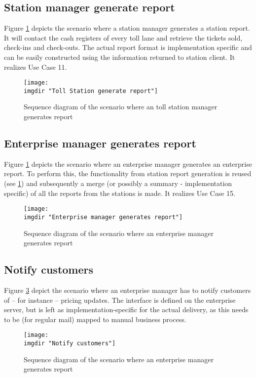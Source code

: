 \subsection{Station manager generate report}
Figure \ref{fig:seq_diag:station_manager_generate_report} depicts the scenario where a station manager generates a station report. It will contact the cash registers of every toll lane and retrieve the tickets sold, check-ins and check-outs. The actual report format is implementation specific and can be easily constructed using the information returned to station client. It realizes Use Case 11.
\begin{figure} %
  \texttt{[image: \\imgdir "Toll Station generate report"]}
  \caption{Sequence diagram of the scenario where an toll station manager generates report}
  \label{fig:seq_diag:station_manager_generate_report}
\end{figure}

\subsection{Enterprise manager generates report}
Figure \ref{fig:seq_diag:station_manager_generate_report} depicts the scenario where an enterprise manager generates an enterprise report. To perform this, the functionality from station report generation is reused (see \ref{fig:seq_diag:station_manager_generate_report}) and subsequently a merge (or possibly a summary - implementation specific) of all the reports from the stations is made. It realizes Use Case 15.
\begin{figure}%
  \texttt{[image: \\imgdir "Enterprise manager generates report"]}
  \caption{Sequence diagram of the scenario where an enterprise manager generates report}
  \label{fig:seq_diag:enterprise_manager_generate_report}
\end{figure}

\subsection{Notify customers}
Figure \ref{fig:seq_diag:notify_customers} depict the scenario where an enterprise manager has to notify customers of -- for instance -- pricing updates. The interface is defined on the enterprise server, but is left as implementation-specific for the actual delivery, as this needs to be (for regular mail) mapped to manual business process.
\begin{figure}%
  \texttt{[image: \\imgdir "Notify customers"]}
  \caption{Sequence diagram of the scenario where an enterprise manager generates report}
  \label{fig:seq_diag:notify_customers}
\end{figure}

